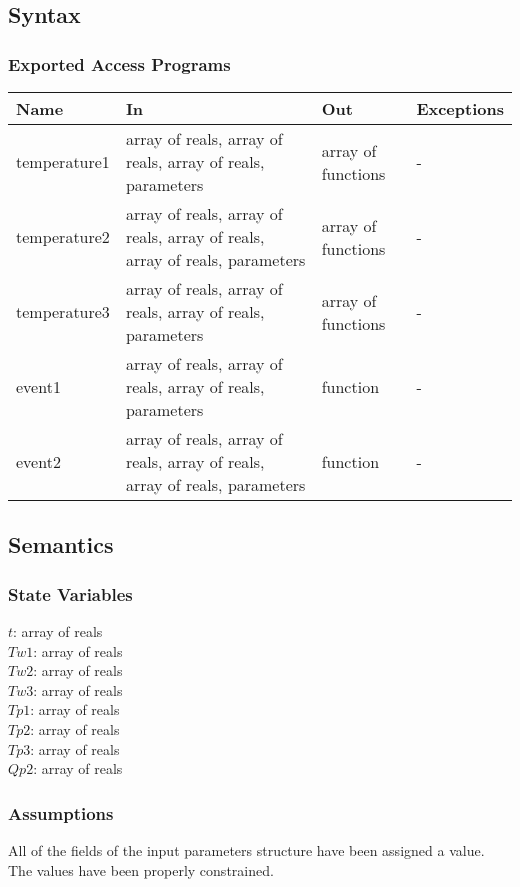 \documentclass[12pt]{article}
\begin{document}
\subsection{Syntax}
\subsubsection{Exported Access Programs}
\begin{center}
\begin{tabular}{p{3cm} p{5cm} p{4cm} p{2cm}}
\hline
\textbf{Name} & \textbf{In} & \textbf{Out} & \textbf{Exceptions} \\
\hline
temperature1 & array of reals, array of reals, array of reals, parameters & array of functions & - \\
\hline
temperature2 & array of reals, array of reals, array of reals, array of reals, parameters & array of functions & - \\
\hline
temperature3 & array of reals, array of reals, array of reals, parameters & array of functions & - \\
\hline
event1 & array of reals, array of reals, array of reals, parameters & function & - \\
\hline
event2 & array of reals, array of reals, array of reals, array of reals, parameters & function & - \\
\hline
\end{tabular}
\end{center}
\subsection{Semantics}
\subsubsection{State Variables}
$t$: array of reals \\
$Tw1$: array of reals \\
$Tw2$: array of reals \\
$Tw3$: array of reals \\
$Tp1$: array of reals \\
$Tp2$: array of reals \\
$Tp3$: array of reals \\
$Qp2$: array of reals 
\subsubsection{Assumptions}
All of the fields of the input parameters structure have been assigned a value. The values have been properly constrained. 
\end{document}
